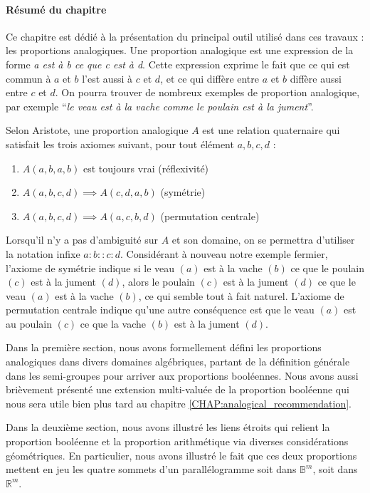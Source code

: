 \paragraph{Résumé du chapitre}
Ce chapitre est dédié à la présentation du principal outil utilisé dans ces
travaux : les proportions analogiques. Une proportion analogique est une
expression de la forme \textit{a est à b ce que c est à d}. Cette expression
exprime le fait que ce qui est commun à $a$ et $b$ l'est aussi à $c$ et $d$, et
ce qui diffère entre $a$ et $b$ diffère aussi entre $c$ et $d$. On pourra
trouver de nombreux exemples de proportion analogique, par exemple ``\textit{le
veau est à la vache comme le poulain est à la jument}''.

Selon Aristote, une proportion analogique $A$ est une relation quaternaire qui
satisfait les trois axiomes suivant, pour tout élément $a, b, c, d$ :

\begin{enumerate}
\item $A(a,b,a,b)$ est toujours vrai (réflexivité)
\item $A(a,b,c,d) \implies A(c,d,a,b)$ (symétrie)
\item $A(a,b,c,d) \implies A(a,c,b,d)$ (permutation centrale)
\end{enumerate}

Lorsqu'il n'y a pas d'ambiguité sur $A$ et son domaine, on se permettra
d'utiliser la notation infixe $a:b::c:d$. Considérant à nouveau notre exemple
fermier, l'axiome de symétrie indique si le veau  $(a)$ est à la vache $(b)$
ce que le poulain $(c)$ est à la jument $(d)$, alors le poulain $(c)$ est  à la
jument $(d)$ ce que le veau $(a)$ est à la vache $(b)$, ce qui semble tout à
fait naturel. L'axiome de permutation centrale indique qu'une autre conséquence
est que le veau $(a)$ est au poulain $(c)$ ce que la vache $(b)$ est à la
jument $(d)$.

Dans la première section, nous avons formellement défini les proportions
analogiques dans divers domaines algébriques, partant de la définition générale
dans les semi-groupes pour arriver aux proportions booléennes. Nous avons aussi
brièvement présenté une extension multi-valuée de la proportion booléenne qui
nous sera utile bien plus tard au chapitre
\ref{CHAP:analogical_recommendation}.

Dans la deuxième section, nous avons illustré les liens étroits qui relient la
proportion booléenne et la proportion arithmétique via diverses considérations
géométriques. En particulier, nous avons illustré le fait que ces deux
proportions mettent en jeu les quatre sommets d'un parallélogramme soit dans
$\mathbb{B}^m$, soit dans $\mathbb{R}^m$.


